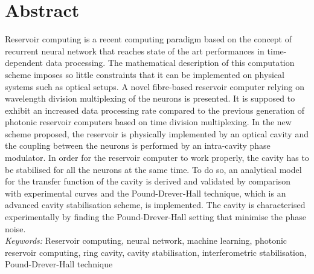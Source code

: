 \chapter*{Abstract}

Reservoir computing is a recent computing paradigm based on the concept of recurrent neural network that reaches state of the art performances in time-dependent data processing. The mathematical description of this computation scheme imposes so little constraints that it can be implemented on physical systems such as optical setups. A novel fibre-based reservoir computer relying on wavelength division multiplexing of the neurons is presented. It is supposed to exhibit an increased data processing rate compared to the previous generation of photonic reservoir computers based on time division multiplexing. In the new scheme proposed, the reservoir is physically implemented by an optical cavity and the coupling between the neurons is performed by an intra-cavity phase modulator. In order for the reservoir computer to work properly, the cavity has to be stabilised for all the neurons at the same time. To do so, an analytical model for the transfer function of the cavity is derived and validated by comparison with experimental curves and the Pound-Drever-Hall technique, which is an advanced cavity stabilisation scheme, is implemented. The cavity is characterised experimentally by finding the Pound-Drever-Hall setting that minimise the phase noise.\\

\textit{Keywords:} Reservoir computing, neural network, machine learning, photonic reservoir computing, ring cavity, cavity stabilisation, interferometric stabilisation, Pound-Drever-Hall technique